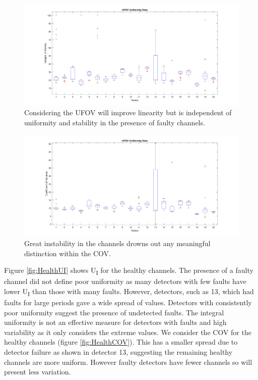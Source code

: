 \begin{figure}[!t]
\centering
\includegraphics[width=5.6in]{figures/UFOVUBox.png}

    \caption{Considering the \acrshort{UFOV} will improve linearity but is independent of uniformity and stability in the presence of faulty channels.} \label{fig:UFOVUBox}
\end{figure}

\begin{figure}[!t]
\centering
\includegraphics[width=5.6in]{figures/UFOVCOVBox.png}

    \caption{Great instability in the channels drowns out any meaningful distinction within the \acrshort{COV}.} \label{fig:UFOVCovBox}
\end{figure}

Figure \ref{fig:HealthUI} shows U\textsubscript{I} for the healthy channels. The presence of a faulty channel did not define poor uniformity as many detectors with few faults have lower U\textsubscript{I} than those with many faults. However, detectors, such as 13, which had faults for large periods gave a wide spread of values. Detectors with consistently poor uniformity suggest the presence of undetected faults. 
The integral uniformity is not an effective measure for detectors with faults and high variability as it only considers the extreme values. We consider the \acrshort{COV} for the healthy channels (figure \ref{fig:HealthCOV}). This has a smaller spread due to detector failure as shown in detector 13, suggesting the remaining healthy channels are more uniform. However faulty detectors have fewer channels so will present less variation. 

